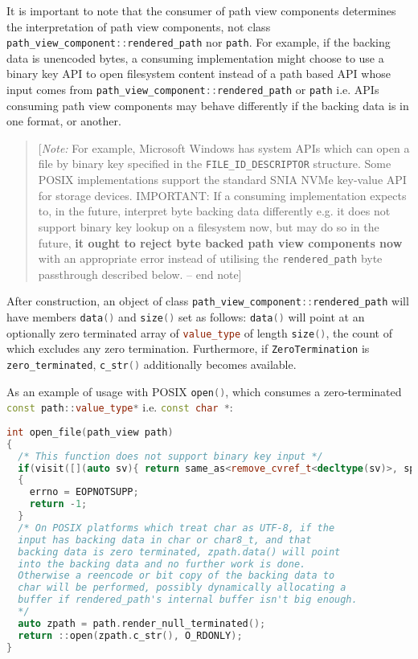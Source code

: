\documentclass[11pt]{article}
\newcommand{\code}[2][cpp]{\lstinline[language=#1,basicstyle=\small\ttfamily]{#2}}
\newcommand{\note}[1]{\begin{quote}[\textit{Note:} #1 -- end note]\end{quote}}
\begin{document}
\color{darkgreen}

It is important to note that the consumer of path view components determines the interpretation of path view components, not class \code{path_view_component::rendered_path} nor \code{path}. For example, if the backing data is unencoded bytes, a consuming implementation might choose to use a binary key API to open filesystem content instead of a path based API whose input comes from \code{path_view_component::rendered_path} or \code{path} i.e. APIs consuming path view components may behave differently if the backing data is in one format, or another.

\color{black}

\note{For example, Microsoft Windows has system APIs which can open a file by binary key specified in the \code{FILE_ID_DESCRIPTOR} structure. Some POSIX implementations support the standard SNIA NVMe key-value API for storage devices. IMPORTANT: If a consuming implementation expects to, in the future, interpret byte backing data differently e.g. it does not support binary key lookup on a filesystem now, but may do so in the future, \textbf{it ought to reject byte backed path view components now} with an appropriate error instead of utilising the \code{rendered_path} byte passthrough described below.}

\color{darkgreen}

After construction, an object of class \code{path_view_component::rendered_path} will have members \code{data()} and \code{size()} set as follows: \code{data()} will point at an optionally zero terminated array of \code{value_type} of length \code{size()}, the count of which excludes any zero termination. Furthermore, if \code{ZeroTermination} is \code{zero_terminated}, \code{c_str()} additionally becomes available.

As an example of usage with POSIX \code{open()}, which consumes a zero-terminated \code{const path::value_type*} i.e. \code{const char *}:

\begin{lstlisting}[language=cpp]
int open_file(path_view path)
{
  /* This function does not support binary key input */
  if(visit([](auto sv){ return same_as<remove_cvref_t<decltype(sv)>, span<const byte>>; }, path))
  {
    errno = EOPNOTSUPP;
    return -1;
  }
  /* On POSIX platforms which treat char as UTF-8, if the
  input has backing data in char or char8_t, and that
  backing data is zero terminated, zpath.data() will point
  into the backing data and no further work is done.
  Otherwise a reencode or bit copy of the backing data to
  char will be performed, possibly dynamically allocating a
  buffer if rendered_path's internal buffer isn't big enough.
  */
  auto zpath = path.render_null_terminated();
  return ::open(zpath.c_str(), O_RDONLY);
}
\end{lstlisting}
\end{document}
